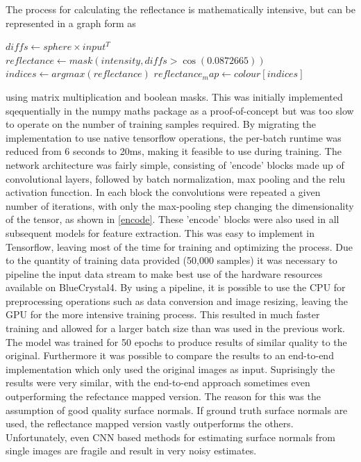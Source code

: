 \documentclass[ %
                    author={Gavin Parker},
                supervisor={Dr. Neill Campbell},
                    degree={MEng},
                     title={Deep Siamese Networks for Illumination Estimation from Stereo Images},
                  subtitle={},
                      type={research},
                      year={2018} ]{dissertation}
\begin{document}
\newline
The process for calculating the reflectance is mathematically intensive, but can be represented in a graph form as
\begin{algorithm}
$ diffs \leftarrow sphere \times input^T $\;
$ reflectance \leftarrow mask(intensity, diffs > \cos(0.0872665)) $\;
$ indices \leftarrow argmax(reflectance) $\;
$ reflectance_map \leftarrow colour[indices] $\;
\end{algorithm}
using matrix multiplication and boolean masks. This was initially implemented sqequentially in the numpy maths package as a proof-of-concept but was too slow to operate on the number of training samples required. By migrating the implementation to use native tensorflow operations, the per-batch runtime was reduced from 6 seconds to 20ms, making it feasible to use during training.
\newline
The network architecture was fairly simple, consisting of 'encode' blocks made up of convolutional layers, followed by batch normalization, max pooling and the relu activation funcction. In each block the convolutions were repeated a given number of iterations, with only the max-pooling step changing the dimensionality of the tensor, as shown in \ref{encode}. These 'encode' blocks were also used in all subsequent models for feature extraction. This was easy to implement in Tensorflow, leaving most of the time for training and optimizing the process. Due to the quantity of training data provided (50,000 samples) it was necessary to pipeline the input data stream to make best use of the hardware resources available on BlueCrystal4. By using a pipeline, it is possible to use the CPU for preprocessing operations such as data conversion and image resizing, leaving the GPU for the more intensive training process. This resulted in much faster training and allowed for a larger batch size than was used in the previous work. The model was trained for 50 epochs to produce results of similar quality to the original. Furthermore it was possible to compare the results to an end-to-end implementation which only used the original images as input. Suprisingly the results were very similar, with the end-to-end approach sometimes even outperforming the refectance mapped version. The reason for this was the assumption of good quality surface normals. If ground truth surface normals are used, the reflectance mapped version vastly outperforms the others. Unfortunately, even CNN based methods for estimating surface normals from single images are fragile and result in very noisy estimates.
\newline
\end{document}
